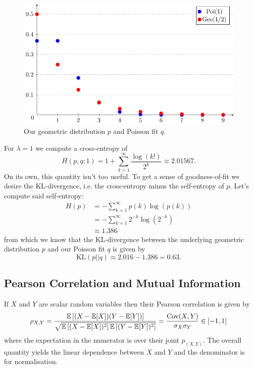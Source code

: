 \documentclass[11pt]{article}
\begin{document}
\begin{appendices}
\begin{figure}[t]
    \centering
    \includegraphics[width=\columnwidth]{./figures/appendix/poi_geo_plot.pdf}
    \caption{Our geometric distribution $p$ and Poisson fit $q$.}
    \label{fig:poi_geo_plot}
\end{figure}

For $\lambda=1$ we compute a cross-entropy of
$$
H(p,q;1)
=
1+\sum_{k=1}^{\infty}\frac{\log(k!)}{2^k}
\approx
2.01567.
$$
On its own, this quantity isn't too useful. To get a sense of goodness-of-fit we desire the KL-divergence, i.e. the cross-entropy minus the self-entropy of $p$. Let's compute said self-entropy:
\begin{align*}
    H(p)
    &=
    -\sum_{k=1}^{\infty}p(k)\log(p(k))\\
    &=
    -\sum_{k=1}^{\infty}2^{-k}\log(2^{-k})\\
    &\approx
    1.386
\end{align*}
from which we know that the KL-divergence between the underlying geometric distribution $p$ and our Poisson fit $q$ is given by
$$
\text{KL}(p||q)
\approx
2.016-1.386
=
0.63.
$$

\subsection{Pearson Correlation and Mutual Information}
\label{app:pearson_correlation}
If $X$ and $Y$ are scalar random variables then their Pearson correlation is given by
$$
\rho_{X,Y}
=
\frac{\mathbb{E}\left[(X-\mathbb{E}[X])(Y-\mathbb{E}[Y])\right]}{\sqrt{\mathbb{E}\left[(X-\mathbb{E}[X])^2\right]\mathbb{E}\left[(Y-\mathbb{E}[Y])^2\right]}}
=
\frac{\text{Cov}(X,Y)}{\sigma_X\sigma_Y}
\in[-1,1]
$$
where the expectation in the numerator is over their joint $p_{(X,Y)}$. The overall quantity yields the linear dependence between $X$ and $Y$ and the denominator is for normalisation.


\end{appendices}
\end{document}
